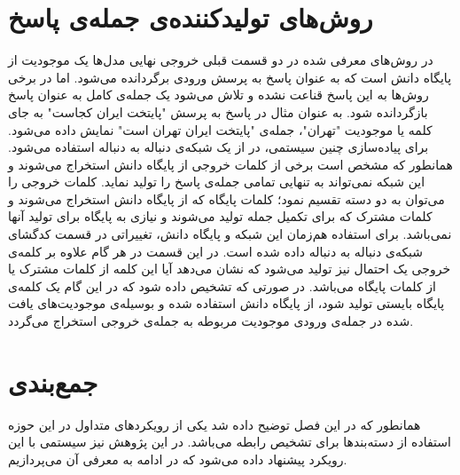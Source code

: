 \section{روش‌های تولیدکننده‌ی جمله‌ی پاسخ}
در روش‌های معرفی شده در دو قسمت قبلی خروجی نهایی مدل‌ها یک موجودیت از پایگاه دانش است که به عنوان پاسخ به پرسش ورودی برگردانده می‌شود. اما در برخی روش‌ها به این پاسخ قناعت نشده و تلاش می‌شود یک جمله‌ی کامل به عنوان پاسخ بازگردانده شود. به عنوان مثال در پاسخ به پرسش "پایتخت ایران کجاست" به جای کلمه یا موجودیت "تهران"، جمله‌ی "پایتخت ایران تهران است" نمایش داده می‌شود.
برای پیاده‌سازی چنین سیستمی، در \cite{yini2016neuralgenerative} از یک شبکه‌ی دنباله به دنباله استفاده می‌شود. همانطور که مشخص است برخی از کلمات خروجی از پایگاه دانش استخراج می‌شوند و این شبکه نمی‌تواند به تنهایی تمامی جمله‌ی پاسخ را تولید نماید. کلمات خروجی را می‌توان به دو دسته‌ تقسیم نمود؛ کلمات پایگاه که از پایگاه دانش استخراج می‌شوند و کلمات مشترک که برای تکمیل جمله تولید می‌شوند و نیازی به پایگاه برای تولید آنها نمی‌باشد. برای استفاده هم‌زمان این شبکه و پایگاه دانش، تغییراتی در قسمت کدگشای شبکه‌ی دنباله به دنباله داده شده است. در این قسمت در هر گام علاوه بر کلمه‌ی خروجی یک احتمال نیز تولید می‌شود که نشان می‌دهد آیا این کلمه از کلمات مشترک یا از کلمات پایگاه می‌باشد. در صورتی که تشخیص داده شود که در این گام یک کلمه‌ی پایگاه بایستی تولید شود، از پایگاه دانش استفاده شده و بوسیله‌ی موجودیت‌های یافت شده در جمله‌ی ورودی موجودیت مربوطه به جمله‌ی خروجی استخراج می‌گردد.
\section{جمع‌بندی}
همانطور که در این فصل توضیح داده شد یکی از رویکردهای متداول در این حوزه استفاده از دسته‌بندها برای تشخیص رابطه می‌باشد. در این پژوهش نیز سیستمی با این رویکرد پیشنهاد داده می‌شود که در ادامه به معرفی آن می‌پردازیم.